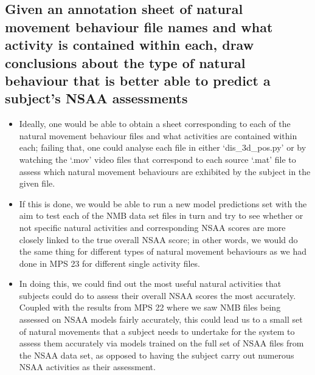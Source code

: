 \documentclass[12pt,twoside]{report}
\begin{document}
\subsection{Given an annotation sheet of natural movement behaviour file names and what activity is contained within each, draw conclusions about the type of natural behaviour that is better able to predict a subject’s NSAA assessments}
\begin{itemize}
	\item Ideally, one would be able to obtain a sheet corresponding to each of the natural movement behaviour files and what activities are contained within each; failing that, one could analyse each file in either ‘dis\_3d\_pos.py’ or by watching the ‘.mov’ video files that correspond to each source ‘.mat’ file to assess which natural movement behaviours are exhibited by the subject in the given file.
	\item If this is done, we would be able to run a new model predictions set with the aim to test each of the NMB data set files in turn and try to see whether or not specific natural activities and corresponding NSAA scores are more closely linked to the true overall NSAA score; in other words, we would do the same thing for different types of natural movement behaviours as we had done in MPS 23 for different single activity files.
	\item In doing this, we could find out the most useful natural activities that subjects could do to assess their overall NSAA scores the most accurately. Coupled with the results from MPS 22 where we saw NMB files being assessed on NSAA models fairly accurately, this could lead us to a small set of natural movements that a subject needs to undertake for the system to assess them accurately via models trained on the full set of NSAA files from the NSAA data set, as opposed to having the subject carry out numerous NSAA activities as their assessment.
\end{itemize}

\end{document}
